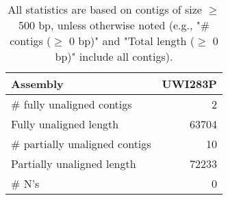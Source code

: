 \documentclass[12pt,a4paper]{article}
\begin{document}
\begin{table}[ht]
\begin{center}
\caption{All statistics are based on contigs of size $\geq$ 500 bp, unless otherwise noted (e.g., "\# contigs ($\geq$ 0 bp)" and "Total length ($\geq$ 0 bp)" include all contigs).}
\begin{tabular}{|l*{1}{|r}|}
\hline
Assembly & UWI283P \\ \hline
\# fully unaligned contigs & 2 \\ \hline
Fully unaligned length & 63704 \\ \hline
\# partially unaligned contigs & 10 \\ \hline
Partially unaligned length & 72233 \\ \hline
\# N's & 0 \\ \hline
\end{tabular}
\end{center}
\end{table}
\end{document}
